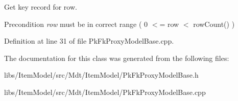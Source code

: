 Get key record for row. 

\begin{DoxyPrecond}{Precondition}
{\itshape row} must be in correct range ( 0 $<$= row $<$ row\+Count() ) 
\end{DoxyPrecond}


Definition at line 31 of file Pk\+Fk\+Proxy\+Model\+Base.\+cpp.



The documentation for this class was generated from the following files\+:\begin{DoxyCompactItemize}
\item 
libs/\+Item\+Model/src/\+Mdt/\+Item\+Model/Pk\+Fk\+Proxy\+Model\+Base.\+h\item 
libs/\+Item\+Model/src/\+Mdt/\+Item\+Model/Pk\+Fk\+Proxy\+Model\+Base.\+cpp\end{DoxyCompactItemize}
